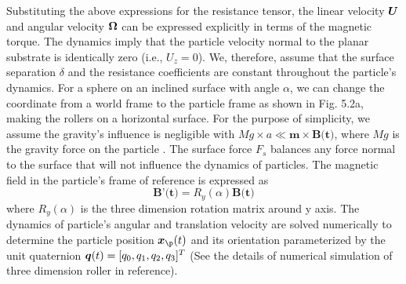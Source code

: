 Substituting the above expressions for the resistance tensor, the linear velocity $\boldsymbol{U}$ and angular velocity $\boldsymbol{\Omega}$ can be expressed explicitly in terms of the magnetic torque. The dynamics imply that the particle velocity normal to the planar substrate is identically zero (i.e., $U_z=0$). We, therefore, assume that the surface separation $\delta$ and the resistance coefficients are constant throughout the particle's dynamics. For a sphere on an inclined surface with angle $\alpha$, we can change the coordinate from a world frame to the particle frame as shown in Fig. 5.2a, making the rollers  on a horizontal surface. For the purpose of simplicity, we assume the gravity's influence is negligible with $Mg\times a \ll \textbf{m} \times \textbf{B(t)}$, where $Mg$ is the gravity force on the particle . The surface force $F_s$ balances any force normal to the surface that will not influence the dynamics of particles. The magnetic field in the particle's frame of reference is expressed as
\begin{equation}
    \textbf{B'(t)}=R_y(\alpha)\textbf{B(t)} 
\end{equation}
where $R_y(\alpha)$ is the three dimension rotation matrix around y axis.  The dynamics of particle's angular and translation velocity are solved numerically to determine the particle position $\ve{x}_{\p}(t)$ and its orientation parameterized by the unit quaternion $\boldsymbol{q}(t)=[q_0,q_1,q_2,q_3]^T$ (See the details of numerical simulation of three dimension roller in reference\autocite{diebel2006representing,fei2019magneto}). 
